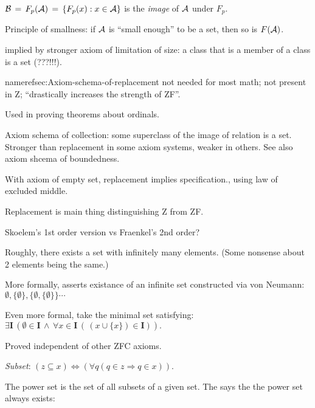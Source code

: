 $\mathcal{B}\,=\,F_p(\mathcal{A}) \,=\, \{F_p(x) : x \in \mathcal{A}\}$ 
is the \textsl{image} of $\mathcal{A}$ under $F_p$.

Principle of smallness: if $\mathcal{A}$ is 
``small enough'' to be a set,
then so is $F(\mathcal{A})$.

 implied by stronger
axiom of limitation of 
size\cite{wiki:Axiom_of_limitation_of_size}:
a class that is a member of a class is a set (???!!!).

nameref{sec:Axiom-schema-of-replacement} not needed for most math;
not present in \textsf{Z};
``drastically increases the strength of \textsf{ZF}''.

Used in proving theorems about ordinals.

Axiom schema of collection: some superclass of 
the image of relation is a set.
Stronger than replacement
in some axiom systems, weaker in others.
See also axiom shcema of boundedness.

With axiom of empty set, replacement implies specification.,
using law of excluded middle.

Replacement is main thing distinguishing \textsf{Z}
from \textsf{ZF}.

Skoelem's 1st order version vs Fraenkel's 2nd order?
\label{sec:Axiom-of-infinity}

Roughly, there exists a set with infinitely many 
elements\cite{wiki:Axiom_of_infinity}.
(Some nonsense about 2 elements being the same.)

More formally, asserts existance of an infinite set 
constructed via von Neumann:
$\emptyset, \{\emptyset\}, \{ \emptyset, \{\emptyset\} \} \cdots$

Even more formal, take the minimal set satisfying:
${\displaystyle 
\exists \mathbf {I}
 \,(\emptyset \in \mathbf {I}
 \,\land \,
 \forall x\in \mathbf {I} \,
 (\,(x\cup \{x\})\in \mathbf {I} )).}$
 
 Proved independent of other \textsf{ZFC} axioms.
 
 
\label{sec:Axiom-of-power-set}

\textsl{Subset}:
$(z\subseteq x)
 \Leftrightarrow 
 (\forall q(q\in z\Rightarrow q\in x)).$
 
The power set is the set of all subsets of a given set.
The  says the the power set
always exists\cite{wiki:Axiom_of_power_set}:

